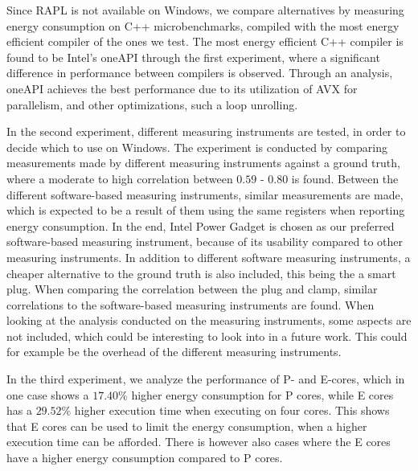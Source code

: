 Since RAPL is not available on Windows, we compare alternatives by measuring energy consumption on C++ microbenchmarks, compiled with the most energy efficient compiler of the ones we test. The most energy efficient C++ compiler is found to be Intel's oneAPI through the first experiment, where a significant difference in performance between compilers is observed. Through an analysis, oneAPI achieves the best performance due to its utilization of AVX for parallelism, and other optimizations, such a loop unrolling.


In the second experiment, different measuring instruments are tested, in order to decide which to use on Windows. The experiment is conducted by comparing measurements made by different measuring instruments against a ground truth, where a moderate to high correlation between $0.59$ - $0.80$ is found. Between the different software-based measuring instruments, similar measurements are made, which is expected to be a result of them using the same registers when reporting energy consumption. In the end, Intel Power Gadget is chosen as our preferred software-based measuring instrument, because of its usability compared to other measuring instruments. In addition to different software measuring instruments, a cheaper alternative to the ground truth is also included, this being the a smart plug. When comparing the correlation between the plug and clamp, similar correlations to the software-based measuring instruments are found. When looking at the analysis conducted on the measuring instruments, some aspects are not included, which could be interesting to look into in a future work. This could for example be the overhead of the different measuring instruments.

In the third experiment, we analyze the performance of P- and E-cores, which in one case shows a $17.40\%$ higher energy consumption for P cores, while E cores has a $29.52\%$ higher execution time when executing on four cores. This shows that E cores can be used to limit the energy consumption, when a higher execution time can be afforded. There is however also cases where the E cores have a higher energy consumption compared to P cores.



